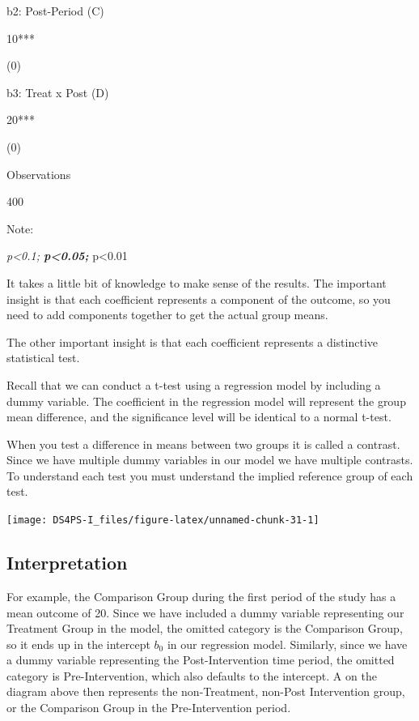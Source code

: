 \documentclass[]{book}
\theoremstyle{definition}
\theoremstyle{definition}
\theoremstyle{definition}
\theoremstyle{remark}
\begin{document}
b2: Post-Period (C)

10***

(0)

b3: Treat x Post (D)

20***

(0)

Observations

400

Note:

\emph{p\textless{}0.1; \textbf{p\textless{}0.05; }}p\textless{}0.01

It takes a little bit of knowledge to make sense of the results. The
important insight is that each coefficient represents a component of the
outcome, so you need to add components together to get the actual group
means.

The other important insight is that each coefficient represents a
distinctive statistical test.

Recall that we can conduct a t-test using a regression model by
including a dummy variable. The coefficient in the regression model will
represent the group mean difference, and the significance level will be
identical to a normal t-test.

When you test a difference in means between two groups it is called a
contrast. Since we have multiple dummy variables in our model we have
multiple contrasts. To understand each test you must understand the
implied reference group of each test.

\begin{center}\texttt{[image: DS4PS-I\_files/figure-latex/unnamed-chunk-31-1]} \end{center}

\hypertarget{interpretation}{%
\subsection{Interpretation}\label{interpretation}}

For example, the Comparison Group during the first period of the study
has a mean outcome of 20. Since we have included a dummy variable
representing our Treatment Group in the model, the omitted category is
the Comparison Group, so it ends up in the intercept \(b_{0}\) in our
regression model. Similarly, since we have a dummy variable representing
the Post-Intervention time period, the omitted category is
Pre-Intervention, which also defaults to the intercept. A on the diagram
above then represents the non-Treatment, non-Post Intervention group, or
the Comparison Group in the Pre-Intervention period.
\end{document}
